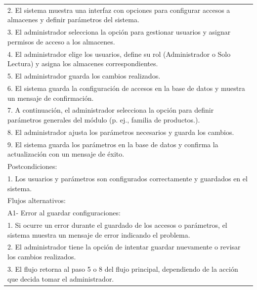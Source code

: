 \documentclass[stu, 12pt, letterpaper, donotrepeattitle, floatsintext, natbib]{apa7}
\begin{document}
\begin{longtable}{@{} p{16.5cm} @{}}
    2. El sistema muestra una interfaz con opciones para configurar accesos a almacenes y definir par\'ametros del sistema.                            \\
    3. El administrador selecciona la opci\'on para gestionar usuarios y asignar permisos de acceso a los almacenes.                                   \\
    4. El administrador elige los usuarios, define su rol (Administrador o Solo Lectura) y asigna los almacenes correspondientes.                      \\
    5. El administrador guarda los cambios realizados.                                                                                                 \\
    6. El sistema guarda la configuraci\'on de accesos en la base de datos y muestra un mensaje de confirmaci\'on.                                     \\
    7. A continuaci\'on, el administrador selecciona la opci\'on para definir par\'ametros generales del m\'odulo (p. ej., familia de productos.).     \\
    8. El administrador ajusta los par\'ametros necesarios y guarda los cambios.                                                                       \\
    9. El sistema guarda los par\'ametros en la base de datos y confirma la actualizaci\'on con un mensaje de \'exito.                                 \\ \midrule
    Postcondiciones:                                                                                                                                   \\
    1. Los usuarios y par\'ametros son configurados correctamente y guardados en el sistema.                                                           \\ \midrule
    Flujos alternativos:                                                                                                                               \\
    A1- Error al guardar configuraciones:                                                                                                              \\
    \hspace{1cm}1. Si ocurre un error durante el guardado de los accesos o par\'ametros, el sistema muestra un mensaje de error indicando el problema. \\
    \hspace{1cm}2. El administrador tiene la opci\'on de intentar guardar nuevamente o revisar los cambios realizados.                                 \\
    \hspace{1cm}3. El flujo retorna al paso 5 o 8 del flujo principal, dependiendo de la acci\'on que decida tomar el administrador.                   \\ \bottomrule
\end{longtable}
\end{document}
